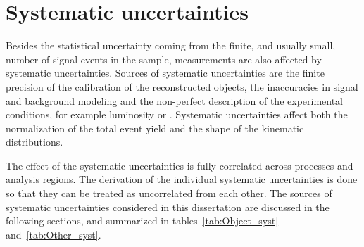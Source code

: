 \section{Systematic uncertainties}
Besides the statistical uncertainty coming from the finite, and usually small, number of signal events in the sample, measurements are also affected by systematic uncertainties.
Sources of systematic uncertainties are the finite precision of the calibration of the reconstructed objects, the inaccuracies in signal and background modeling and the non-perfect description of the experimental conditions, for example luminosity or \pileup. Systematic uncertainties affect both the normalization of the total event yield and the shape of the kinematic distributions.

The effect of the systematic uncertainties is fully correlated across processes and analysis regions. The derivation of the individual systematic uncertainties is done so that they can be treated as uncorrelated from each other. 
The sources of systematic uncertainties considered in this dissertation are discussed in the following sections, and summarized in tables~\ref{tab:Object_syst} and~\ref{tab:Other_syst}.

